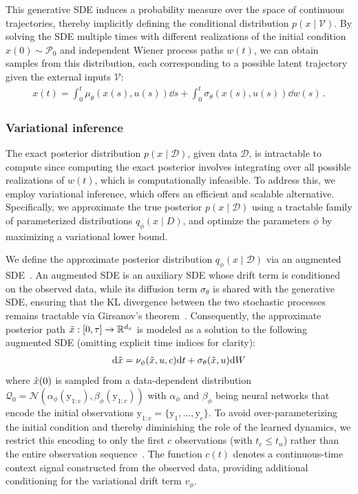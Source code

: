 \documentclass[preprint,12pt]{elsarticle}
\begin{document}
This generative SDE induces a probability measure over the space of continuous trajectories, thereby implicitly defining the conditional distribution $p(x \mid \mathcal{V})$. By solving the SDE multiple times with different realizations of the initial condition $x(0) \sim \mathcal{P}_0$ and independent Wiener process paths $w(t)$, we can obtain samples from this distribution, each corresponding to a possible latent trajectory given the external inputs $\mathcal{V}$:
\begin{align}
    x(t)= \int^t_0 \mu_\theta(x(s), u(s)) \dd s +\int_0^t \sigma_\theta(x(s),u(s))\dd w(s) \,.
    \label{sde_integral}
\end{align}

\subsubsection{Variational inference}
The exact posterior distribution $p(x \mid \mathcal{D})$, given data $\mathcal{D}$, is intractable to compute since computing the exact posterior involves integrating over all possible realizations of $w(t)$, which is computationally infeasible. To address this, we employ variational inference, which offers an efficient and scalable alternative. Specifically, we approximate the true posterior $p(x \mid \mathcal{D})$ using a tractable family of parameterized distributions $q_\phi(x \mid D)$, and optimize the parameters $\phi$ by maximizing a variational lower bound. 

We define the approximate posterior distribution $q_\phi(x \mid \mathcal{D})$ via an augmented SDE~\citep{li2020scalable}. 
An augmented SDE is an auxiliary SDE whose drift term is conditioned on the observed data, while its diffusion term $\sigma_\theta$ is shared with the generative SDE, ensuring that the KL divergence between the two stochastic processes remains tractable via Girsanov's theorem~\citep{girsanov1960transforming}. 
Consequently, the approximate posterior path $\Tilde{x}:[0,\tau] \rightarrow \mathbb{R}^{d_x}$ is modeled as a solution to the following augmented SDE (omitting explicit time indices for clarity): 
\begin{align}
    \dd \Tilde{x}=\nu_\phi(\Tilde{x},u,c)\dd t +\sigma_\theta(\Tilde{x},u)\dd W
    \label{aug_sde}
\end{align}
where $\Tilde{x}(0)$ is sampled from a data-dependent distribution $\mathcal{Q}_0=\mathcal{N}(\alpha_\phi(\mathrm{y}_{1:c}), \beta_\phi(\mathrm{y}_{1:c}))$ with $\alpha_\phi$ and $\beta_\phi$ being neural networks that encode the initial observations $\mathrm{y}_{1:c}=\{\mathrm{y}_1,\ldots, \mathrm{y}_c\}$. To avoid over-parameterizing the initial condition and thereby diminishing the role of the learned dynamics, we restrict this encoding to only the first $c$ observations (with $t_c \leq t_n$) rather than the entire observation sequence~\citep{elgazzar2024generative}.
The function $c(t)$ denotes a continuous-time context signal constructed from the observed data, providing additional conditioning for the variational drift term $v_\phi$. 
\end{document}
